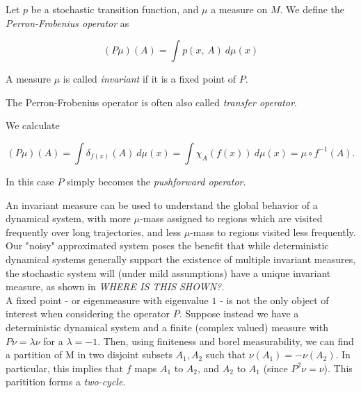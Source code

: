 \begin{definition}
    \cite*{attr} Let $p$ be a stochastic transition function, and $\mu$ a measure on $M$. 
    We define the \emph{Perron-Frobenius operator} as
    
    \begin{equation}
        (P\mu)(A) = \int p(x,\, A)\ d\mu (x)
    \end{equation}
    
    A measure $\mu$ is called \emph{invariant} if it is a fixed point of $P$.
\end{definition}

\begin{remark}
    The Perron-Frobenius operator is often also called \emph{transfer operator}.
\end{remark}

\begin{example} 
    \cite*{attr} We calculate

    \begin{equation}
        (P\mu)(A) = \int \delta_{f(x)} (A)\ d\mu (x) 
        = \int \chi_A (f(x))\ d\mu (x) = \mu \circ f^{-1}(A).
    \end{equation}

    In this case $P$ simply becomes the \emph{pushforward operator}.
\end{example}

An invariant measure can be used to understand the global behavior of a dynamical 
system, with more $\mu$-mass assigned to regions which are visited frequently over long
trajectories, and less $\mu$-mass to regions visited less frequently. \\

Our "noisy" approximated system poses the benefit that while deterministic dynamical systems 
generally support the existence of multiple invariant measures, the stochastic system will 
(under mild assumptions) have a unique invariant measure, as shown in \emph{WHERE IS THIS SHOWN?}. \\

A fixed point - or eigenmeasure with eigenvalue $1$ - is not the only object of interest 
when considering the operator $P$. Suppose instead we have a deterministic dynamical system
and a finite (complex valued) measure with $P \nu = \lambda \nu$ for a $\lambda = -1$. Then, 
using finiteness and borel measurability, we can find a partition of M in two disjoint subsets 
$A_1, A_2$ such that $\nu (A_1) = - \nu (A_2)$. In particular, this implies that $f$ maps 
$A_1$ to $A_2$, and $A_2$ to $A_1$ (since $P^2 \nu = \nu$). This paritition forms a 
\emph{two-cycle}. \\

